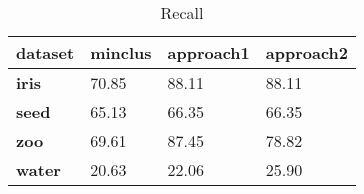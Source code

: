 \begin{table}[ht]
\caption{Recall} 
\begin{center}
		\begin{tabular}{ | l | l | l | l |}
				\hline

				\textbf{dataset} & \textbf{minclus} & \textbf{approach1} & \textbf{approach2} \\ \hline

				\textbf{iris}  & 70.85 & 88.11 & 88.11 \\ \hline
				\textbf{seed}  & 65.13 & 66.35 & 66.35  \\ \hline
				\textbf{zoo}   & 69.61 & 87.45 & 78.82  \\ \hline
				\textbf{water} & 20.63 & 22.06 & 25.90 \\ \hline
		\end{tabular}
\end{center}
\label{table:rec}
\end{table}

